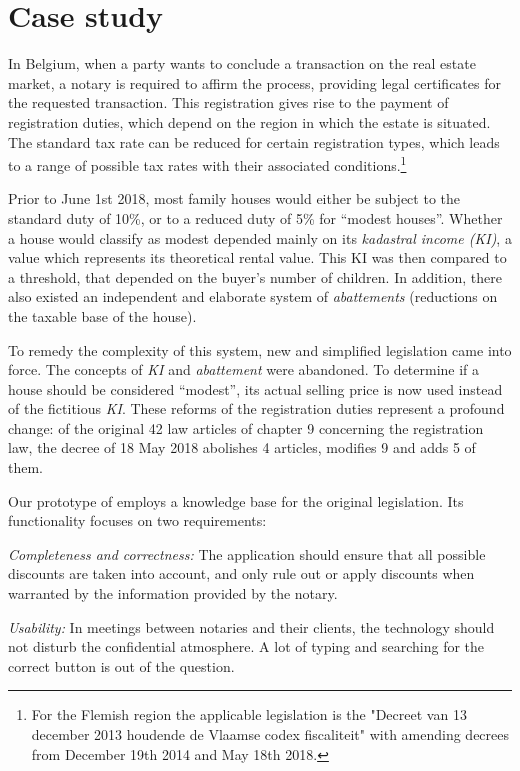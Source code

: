\section{Case study}
\label{case}
In Belgium, when a party wants to conclude a transaction on the real estate
market, a notary is required to affirm the process, providing legal certificates for
the requested transaction. This registration gives rise to the payment of registration duties, which depend on the region in which the estate is situated. 
The standard tax rate can be reduced for certain registration types, which leads to a range of possible tax rates with their associated conditions.\footnote{For the Flemish region the applicable legislation is the "Decreet van 13 december 2013 houdende de Vlaamse codex fiscaliteit" with amending decrees from December 19th 2014 and May 18th 2018.}

Prior to June 1st 2018, most family houses would either be subject to the standard duty of 10\%, or to a reduced duty of 5\% for ``modest houses''. 
Whether a house would classify as modest depended mainly on its \textit{kadastral income (KI)}, a value which represents its theoretical rental value. 
This KI was then compared to a threshold, that depended on the buyer's number of children.
In addition, there also existed an independent and elaborate system of \textit{abattements} (reductions on the taxable base of the house). %

To remedy the complexity of this system, new and simplified legislation came into force.  
The concepts of \textit{KI} and \textit{abattement} were abandoned. 
To determine if a house should be considered ``modest'',  its actual selling price is now used instead of the fictitious \textit{KI}.
These reforms of the registration duties represent a profound change: of the original 42 law articles of chapter 9 concerning the registration law, the decree of 18 May 2018 abolishes 4 articles, modifies 9 and adds 5 of them.%

Our prototype of \cite{ruleml/DeryckHVV18} employs a knowledge base for the original legislation. Its functionality focuses on two requirements:
\begin{compactitem}
\item \emph{Completeness and correctness:} The application should ensure that all possible discounts are taken into account, and only rule out or apply discounts when warranted by the information provided by the notary. 

\item \emph{Usability:}  In meetings between notaries and their clients, the technology should not disturb the confidential atmosphere.  A lot of typing and searching for the correct button is out of the question. 
\end{compactitem}

